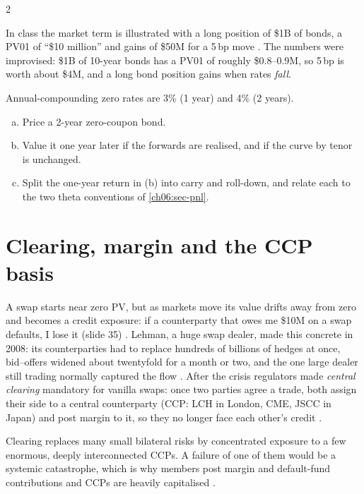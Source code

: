 \begin{paracol}{2}
\begin{coursenote}
In class the market term is illustrated with a long position of \$1B of bonds, a PV01 of ``\$10 million'' and
gains of \$50M for a 5\,bp move . The numbers were improvised: \$1B of 10-year bonds has a PV01
of roughly \$0.8--0.9M, so 5\,bp is worth about \$4M, and a long bond position gains when rates \emph{fall}.
\end{coursenote}

\begin{exercise}\label{ch06:ex-theta}
Annual-compounding zero rates are 3\% (1 year) and 4\% (2 years).
\begin{enumerate}[(a)]
  \item Price a 2-year zero-coupon bond.
  \item Value it one year later if the forwards are realised, and if
      the curve by tenor is unchanged.
  \item Split the one-year return in (b) into carry and roll-down,
      and relate each to the two theta conventions of
      \cref{ch06:sec-pnl}.
\end{enumerate}
\end{exercise}

\section{Clearing, margin and the CCP basis}\label{ch06:sec-clearing}
A swap starts near zero PV, but as markets move its value drifts away from zero and becomes a credit exposure: if
a counterparty that owes me \$10M on a swap defaults, I lose it (slide 35) . Lehman, a huge
swap dealer, made this concrete in 2008: its counterparties had to replace hundreds of billions of hedges at once,
bid--offers widened about twentyfold for a month or two, and the one large dealer still trading normally captured
the flow . After the crisis regulators made \emph{central clearing} mandatory for vanilla
swaps: once two parties agree a trade, both assign their side to a central counterparty (CCP: LCH in London,
CME, JSCC in Japan) and post margin to it, so they no longer face each other's credit .

\begin{finance}
Clearing replaces many small bilateral risks by concentrated exposure to a few enormous, deeply interconnected
CCPs. A failure of one of them would be a systemic catastrophe, which is why members post margin and default-fund
contributions and CCPs are heavily capitalised .
\end{finance}


\end{paracol}
